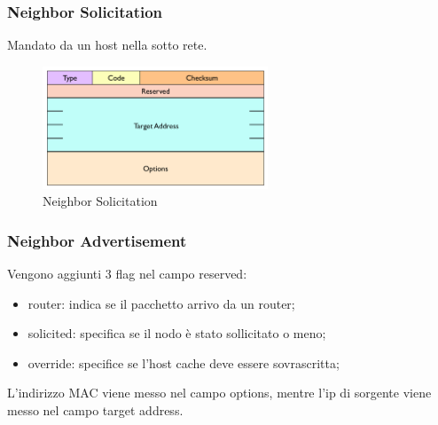 \documentclass[12pt]{article}
\begin{document}
\subsubsection{Neighbor Solicitation}
Mandato da un host nella sotto rete.
\begin{figure}[H]
    \centering
    \includegraphics[width=0.6\textwidth]{neighbor-solicitation.png}
    \caption{Neighbor Solicitation}
    \label{fig:neighbor-solicitation}
\end{figure}


\subsubsection{Neighbor Advertisement}
Vengono aggiunti 3 flag nel campo reserved:
\begin{itemize}
    \item router: indica se il pacchetto arrivo da un router;
    \item solicited: specifica se il nodo \`e stato sollicitato o meno;
    \item override: specifice se l'host cache deve essere sovrascritta;
\end{itemize}
L'indirizzo MAC viene messo nel campo options, mentre l'ip di sorgente viene messo nel campo target address.
\end{document}
